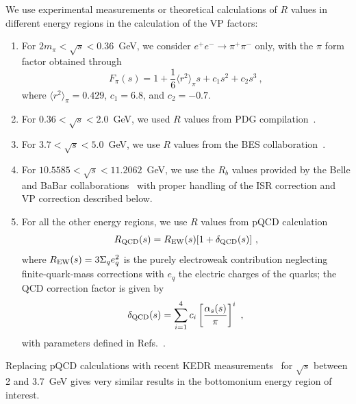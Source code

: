 \documentclass[aps,showpacs,superscriptaddress,preprint,tightenlines]{revtex4}
\newcommand{\Rb}{R_b}
\newcommand{\pp}{\pi^+\pi^-}
\newcommand{\EE}{e^+e^-}
\newcommand{\beq}{\begin{equation}}
\newcommand{\eeq}{\end{equation}}
\begin{document}
We use experimental measurements or theoretical calculations of
$R$ values in different energy regions in the calculation of the
VP factors:
\begin{enumerate}

\item For $2m_{\pi}<\sqrt{s}<0.36$~GeV, we consider $\EE\to \pp$
only, with the $\pi$ form factor obtained
through~\cite{Davier:2002dy}
 \beq
F_{\pi}(s) = 1+ \frac{1}{6} \langle r^2 \rangle_{\pi} s + c_1 s^2
+ c_2 s^3 ~,
 \eeq
where $\langle r^2 \rangle_{\pi} = 0.429$, $c_1 = 6.8$, and
$c_2=-0.7$.

\item For $0.36<\sqrt{s}<2.0$~GeV, we used $R$ values from PDG
compilation~\cite{PDG,experiments}.

\item For $3.7<\sqrt{s}<5.0$~GeV, we use $R$ values from the BES
collaboration~\cite{Bai:1999pk,Bai:2001ct}.

\item For $10.5585<\sqrt{s}<11.2062$~GeV, we use the $\Rb$ values
provided by the Belle and BaBar
collaborations~\cite{babar_rb,belle_rb} with proper handling of
the ISR correction and VP correction described
below.

\item For all the other energy regions, we use $R$ values from
pQCD calculation~\cite{PDG,Rodrigo:1997zd}
 \beq
R_{\rm QCD} (s)=R_{\rm EW}(s) [1+\delta_{\rm QCD}(s)]~, \label{eq:rqcd}
 \eeq
where $R_{\rm EW}(s)=3\Sigma_q e_q^2$ is the purely electroweak
contribution neglecting finite-quark-mass corrections with $e_q$
the electric charges of the quarks; the QCD correction factor is given by
 \beq
\delta_{\rm QCD}(s)= \sum_{i=1}^{4} c_i \left[ \frac{\alpha_s(s)}{\pi}
\right]^i~, \label{eq:deltaqcd}
 \eeq
with parameters defined in Refs.~\cite{PDG,Rodrigo:1997zd}.

\end{enumerate}

Replacing pQCD calculations with recent KEDR measurements~\cite{ref-KEDR1,ref-KEDR2} 
for $\sqrt{s}$ between 2 and 3.7~GeV gives very similar results in the bottomonium 
energy region of interest. 
\end{document}
